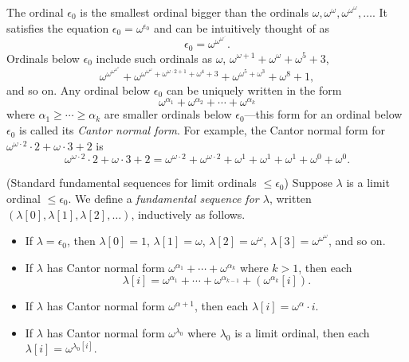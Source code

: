\documentclass[twoside,11pt]{article}
\begin{document}
The ordinal $\epsilon_0$ is the smallest ordinal bigger than the ordinals
$\omega,\omega^\omega,\omega^{\omega^\omega},\ldots$. It satisfies the equation
$\epsilon_0=\omega^{\epsilon_0}$ and can be intuitively thought of as
\[
    \epsilon_0 = \omega^{\omega^{\omega^{\iddots}}}.
\]
Ordinals below $\epsilon_0$ include such ordinals as $\omega$,
$\omega^{\omega+1}+\omega^{\omega}+\omega^5+3$,
\[
\omega^{\omega^{\omega^{\omega^\omega}}}+
\omega^{\omega^{\omega^\omega}+\omega^{\omega\cdot 2+1}+\omega^4 + 3}
+ \omega^{\omega^5+\omega^3}+\omega^8+1,
\]
and so on.
Any ordinal below $\epsilon_0$ can be uniquely written in the form
\[
    \omega^{\alpha_1}+\omega^{\alpha_2}+\cdots + \omega^{\alpha_k}
\]
where $\alpha_1\geq\cdots\geq\alpha_k$ are smaller ordinals below $\epsilon_0$---this form
for an ordinal below $\epsilon_0$ is called its \emph{Cantor normal form}.
For example, the Cantor normal form for $\omega^{\omega\cdot 2}\cdot 2+\omega\cdot 3+2$
is
\[
\omega^{\omega\cdot 2}\cdot 2+\omega\cdot 3+2
=
\omega^{\omega\cdot 2} + \omega^{\omega\cdot 2} + \omega^1 + \omega^1 + \omega^1
+\omega^0 + \omega^0.
\]

\begin{definition}
\label{fundsequencesdefn}
    (Standard fundamental sequences for limit ordinals $\leq\epsilon_0$)
    Suppose $\lambda$ is a limit ordinal $\leq\epsilon_0$. We define a
    \emph{fundamental sequence for $\lambda$},
    written $(\lambda[0],\lambda[1],\lambda[2],\ldots)$, inductively as follows.
    \begin{itemize}
        \item
        If $\lambda=\epsilon_0$, then $\lambda[0]=1$,
        $\lambda[1]=\omega$, $\lambda[2]=\omega^\omega$,
        $\lambda[3]=\omega^{\omega^{\omega}}$,
        and so on.
        \item
        If $\lambda$ has Cantor normal form
        $\omega^{\alpha_1}+\cdots+\omega^{\alpha_k}$ where $k>1$,
        then
        each
        \[
            \lambda[i] = \omega^{\alpha_1}+\cdots+\omega^{\alpha_{k-1}}
            + (\omega^{\alpha_k}[i]).
        \]
        \item
        If $\lambda$ has Cantor normal form $\omega^{\alpha+1}$,
        then each $\lambda[i]=\omega^{\alpha}\cdot i$.
        \item
        If $\lambda$ has Cantor normal form $\omega^{\lambda_0}$ where $\lambda_0$
        is a limit ordinal, then each $\lambda[i]=\omega^{\lambda_0[i]}$.
    \end{itemize}
\end{definition}
\end{document}

